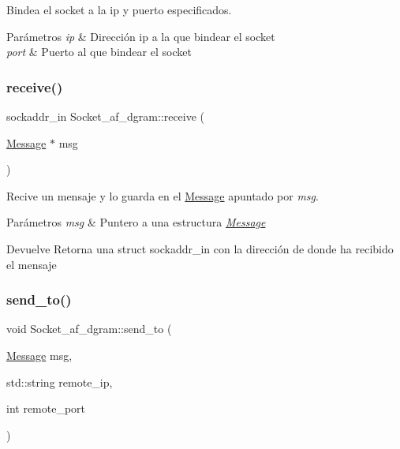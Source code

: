 Bindea el socket a la ip y puerto especificados. 


\begin{DoxyParams}{Parámetros}
{\em ip} & Dirección ip a la que bindear el socket \\
\hline
{\em port} & Puerto al que bindear el socket \\
\hline
\end{DoxyParams}
\mbox{\label{classSocket__af__dgram_a572c1e9c58c11512fa75d0ad7a775857}} 
\subsubsection{\texorpdfstring{receive()}{receive()}}
{\footnotesize\ttfamily sockaddr\+\_\+in Socket\+\_\+af\+\_\+dgram\+::receive (\begin{DoxyParamCaption}\item[{\hyperlink{structMessage}{Message} $\ast$}]{msg }\end{DoxyParamCaption})}



Recive un mensaje y lo guarda en el \hyperlink{structMessage}{Message} apuntado por {\itshape msg}. 


\begin{DoxyParams}{Parámetros}
{\em msg} & Puntero a una estructura {\itshape \hyperlink{structMessage}{Message}} \\
\hline
\end{DoxyParams}
\begin{DoxyReturn}{Devuelve}
Retorna una struct sockaddr\+\_\+in con la dirección de donde ha recibido el mensaje 
\end{DoxyReturn}
\mbox{\label{classSocket__af__dgram_a744bb661eeebe5b5cdfca0028da6bd88}} 
\subsubsection{\texorpdfstring{send\+\_\+to()}{send\_to()}}
{\footnotesize\ttfamily void Socket\+\_\+af\+\_\+dgram\+::send\+\_\+to (\begin{DoxyParamCaption}\item[{\hyperlink{structMessage}{Message}}]{msg,  }\item[{std\+::string}]{remote\+\_\+ip,  }\item[{int}]{remote\+\_\+port }\end{DoxyParamCaption})}



